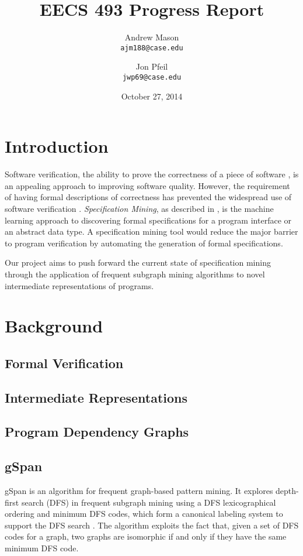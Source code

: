 \documentclass[12pt]{article}
\title{EECS 493 Progress Report}
\author{
    Andrew Mason\\
    \texttt{ajm188@case.edu}
    \and
    Jon Pfeil\\
    \texttt{jwp69@case.edu}
}
\date{October 27, 2014}
\begin{document}
\maketitle
\tableofcontents
\pagebreak

\section{Introduction}
Software verification, the ability to prove the correctness of a piece of software \cite{FormalSoftwareVerification}, is an appealing approach to improving software quality. However, the requirement of having formal descriptions of correctness has prevented the widespread use of software verification \cite{MiningSpecifications}. \textit{Specification Mining}, as described in \cite{MiningSpecifications}, is the machine learning approach to discovering formal specifications for a program interface or an abstract data type. A specification mining tool would reduce the major barrier to program verification by automating the generation of formal specifications.

Our project aims to push forward the current state of specification mining through the application of frequent subgraph mining algorithms to novel intermediate representations of programs.

\section{Background}
\subsection{Formal Verification}

\subsection{Intermediate Representations}

\subsection{Program Dependency Graphs}

\subsection{gSpan}
gSpan is an algorithm for frequent graph-based pattern mining. It explores depth-first  search (DFS) in frequent subgraph mining using a DFS lexicographical ordering and minimum DFS codes, which form a canonical labeling system to support the DFS search \cite{Yan:2002:GGS:844380.844811}. The algorithm exploits the fact that, given a set of DFS codes for a graph, two graphs are isomorphic if and only if they have the same minimum DFS code.
\end{document}
